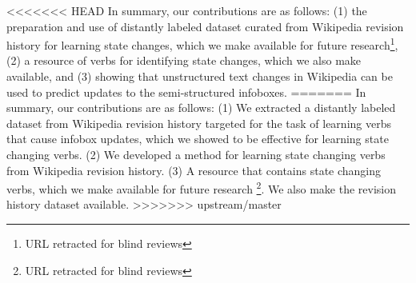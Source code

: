 <<<<<<< HEAD
In summary, our contributions are as follows: (1) the preparation and use of  distantly labeled dataset curated from Wikipedia revision history for learning state changes, which we make available for future research\footnote{URL retracted for blind reviews},(2) a resource of verbs for identifying state changes, which we also make available, and (3) showing that unstructured text changes in Wikipedia can be used to predict updates to the semi-structured infoboxes. 
=======
In summary, our contributions are as follows: (1) We  extracted a  distantly labeled dataset from Wikipedia revision history targeted for the task of  learning verbs that cause  infobox updates, which we showed to be effective for learning state changing verbs.  (2) We developed a method for learning state changing verbs from Wikipedia revision history.
(3) A resource that contains state changing verbs, which we make available for future research \footnote{URL retracted for blind reviews}. We also make the revision history dataset available.
>>>>>>> upstream/master

